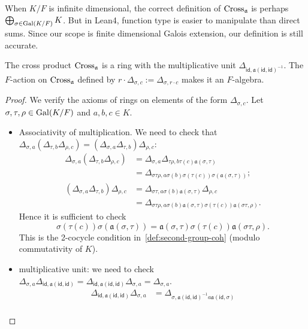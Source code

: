 \begin{remark}
  When $K/F$ is infinite dimensional, the correct definition of $\operatorname{Cross}_{\mathfrak{a}}$ is perhaps $\bigoplus_{\sigma\in\operatorname{Gal}(K/F)}K$. But in Lean4, function type is easier to manipulate than direct sums. Since our scope is finite dimensional Galois extension, our definition is still accurate.
\end{remark}

\begin{lemma}
  The cross product $\operatorname{Cross}_{\mathfrak{a}}$ is a ring with the multiplicative unit $\Delta_{\mathsf{id}, \mathfrak{a}(\mathsf{id}, \mathsf{id})^{-1}}$. The $F$-action on $\operatorname{Cross}_{\mathfrak{a}}$ defined by $r \cdot \Delta_{\sigma, c} := \Delta_{\sigma, r\cdot c}$ makes it an $F$-algebra.
  \leanok
\end{lemma}
\begin{proof}
  We verify the axioms of rings on elements of the form $\Delta_{\sigma, c}$. Let $\sigma,\tau,\rho\in\operatorname{Gal}(K/F)$ and $a,b,c\in K$.
  \begin{itemize}
    \item Associativity of multiplication. We need to check that $\Delta_{\sigma,a}\left(\Delta_{\tau,b}\Delta_{\rho,c}\right) = \left(\Delta_{\sigma,a}\Delta_{\tau,b}\right)\Delta_{\rho,c}$:
          \[
          \begin{aligned}
            \Delta_{\sigma, a}\left(\Delta_{\tau,b}\Delta_{\rho,c}\right)
            &= \Delta_{\sigma,a}\Delta_{\tau\rho,b\tau(c) \mathfrak{a}(\sigma,\tau)}\\
            &= \Delta_{\sigma\tau\rho,a\sigma(b)\sigma(\tau(c)) \sigma(\mathfrak{a}(\sigma, \tau))};\\
            \left(\Delta_{\sigma,a}\Delta_{\tau,b}\right)\Delta_{\rho,c}
            &= \Delta_{\sigma\tau,a\sigma(b)\mathfrak{a}(\sigma,\tau)}\Delta_{\rho,c}\\
            &= \Delta_{\sigma\tau\rho,a\sigma(b)\mathfrak{a}(\sigma, \tau)\sigma(\tau(c))\mathfrak{a}(\sigma\tau, \rho)}.
          \end{aligned}
          \]
          Hence it is sufficient to check
          \[
          \sigma(\tau(c))\sigma(\mathfrak{a}(\sigma,\tau)) =
          \mathfrak{a}(\sigma,\tau)\sigma(\tau(c))\mathfrak{a}(\sigma\tau, \rho).
          \]
          This is the 2-cocycle condition in~\cref{def:second-group-coh} (modulo commutativity of $K$).
    \item multiplicative unit: we need to check $\Delta_{\sigma, a}\Delta_{\mathsf{id},\mathfrak{a}(\mathsf{id}, \mathsf{id})} = \Delta_{\mathsf{id},\mathfrak{a}(\mathsf{id},\mathsf{id})}\Delta_{\sigma, a} = \Delta_{\sigma, a}$.
          \[
          \begin{aligned}
            \Delta_{\mathsf{id},\mathfrak{a}(\mathsf{id}, \mathsf{id})}\Delta_{\sigma, a}
            &= \Delta_{\sigma, \mathfrak{a}(\mathsf{id}, \mathsf{id})^{-1}a\mathfrak{a}(\mathsf{id},\sigma)}\\
          \end{aligned}
          \]
  \end{itemize}
\end{proof}

